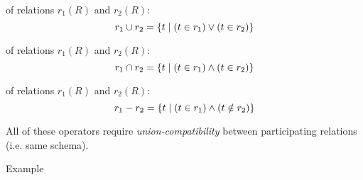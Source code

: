 \begin{multicols}{2}

    \begin{CheatsheetEntryFrame}


        \textit{} of relations $r_1(R)$ and $r_2(R)$:
        \begin{equation*}
            r_1 \cup r_2 = \left\{{t} \mid {(t \in r_1) \vee (t \in r_2)}\right\}
        \end{equation*}

        \textit{} of relations $r_1(R)$ and $r_2(R)$:
        \begin{equation*}
            r_1 \cap r_2 = \left\{{t} \mid {(t \in r_1) \wedge (t \in r_2)}\right\}
        \end{equation*}

        \textit{} of relations $r_1(R)$ and $r_2(R)$:
        \begin{equation*}
            r_1 - r_2 = \left\{{t} \mid {(t \in r_1) \wedge (t \notin r_2)}\right\}
        \end{equation*}

        \vspace{\TextExtraSkip}

        All of these operators require \textit{union-compatibility} between participating relations (i.e. same schema).

        \SubsectionFrameAddSeparation
        \begin{RelAlgSubsection}{Example}
\end{RelAlgSubsection}
\end{CheatsheetEntryFrame}
\end{multicols}
